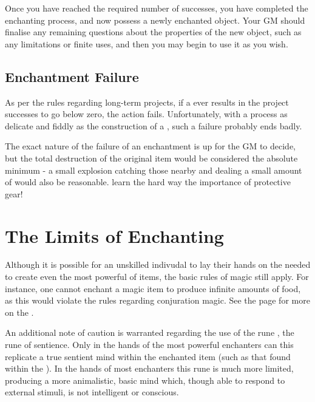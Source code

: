 Once you have reached the required number of successes, you have completed the enchanting process, and now possess a newly enchanted object. Your GM should finalise any remaining questions about the properties of the new object, such as any limitations or finite uses, and then you may begin to use it as you wish.


\subsection{Enchantment Failure}

As per the rules regarding long-term projects, if a  ever results in the project successes to go below zero, the action fails. Unfortunately, with a process as delicate and fiddly as the construction of a , such a failure probably ends badly. 

The exact nature of the failure of an enchantment is up for the GM to decide, but the total destruction of the original item would be considered the absolute minimum - a small explosion catching those nearby and dealing a small amount of  would also be reasonable.  learn the hard way the importance of protective gear!







\section{The Limits of Enchanting}

Although it is possible for an unskilled indivudal to lay their hands on the  needed to create even the most powerful of items, the basic rules of magic still apply. For instance, one cannot enchant a magic item to produce infinite amounts of food, as this would violate the rules regarding conjuration magic. See the page \pageref{S:Laws} for more on the .

An additional note of caution is warranted regarding the use of the rune \rune{\animax}, the rune of sentience. Only in the hands of the most powerful enchanters can this replicate a true sentient mind within the enchanted item (such as that found within the  ). In the hands of most enchanters this rune is much more limited, producing a more animalistic, basic mind which, though able to respond to external stimuli, is not intelligent or conscious.  


